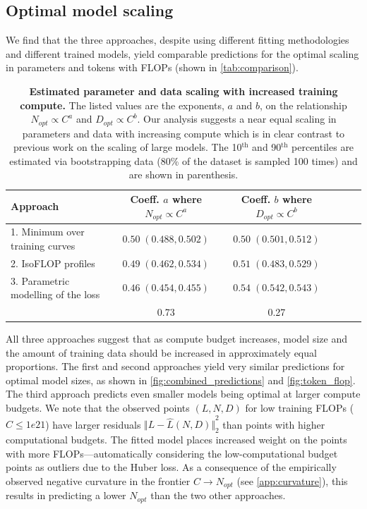 \documentclass[11pt, a4paper, logo, copyright, nonumbering]{deepmind}
\renewcommand{\leq}{\leqslant}
\begin{document}
\subsection{Optimal model scaling}
\label{sec:scaling-results}
We find that the three approaches, despite using different fitting methodologies and different trained models, yield comparable predictions for the optimal scaling in parameters and tokens with FLOPs (shown in \autoref{tab:comparison}).
\begin{table}[t]
    \caption{\textbf{Estimated parameter and data scaling with increased training compute.} 
    The listed values are the exponents, $a$ and $b$, on the relationship $N_{opt} \propto C^a$ and $D_{opt} \propto C^b$.
    Our analysis suggests a near equal scaling in parameters and data with increasing compute which is in clear contrast to previous work on the scaling of large models.
    The 10$^{\text{th}}$ and 90$^{\text{th}}$ percentiles are estimated via bootstrapping data (80\% of the dataset is sampled 100 times) and are shown in parenthesis.
    }
    \centering
    \begin{tabular}{lccccc}
    \toprule
    Approach & Coeff. $a$ where $N_{opt} \propto C^a$ & Coeff. $b$ where $D_{opt} \propto C^b$ \\
     \midrule
    1. Minimum over training curves & $0.50 \; ({0.488}, {0.502})$ & $0.50 \; (0.501, 0.512)$ \\ 
    2. IsoFLOP profiles & $0.49 \; (0.462, 0.534)$ &  $0.51 \; (0.483, 0.529)$ \\ 
    3. Parametric modelling of the loss & $0.46\; (0.454, 0.455)$ & $0.54  \; (0.542, 0.543)$ \\ 
    \midrule
    \citet{kaplan2020scaling} & 0.73 & 0.27 \\ 
    \bottomrule
    \end{tabular}
    \label{tab:comparison}
\end{table}
All three approaches suggest that as compute budget increases, model size and the amount of training data should be increased in approximately equal proportions.
The first and second approaches yield very similar predictions for optimal model sizes, as shown in \autoref{fig:combined_predictions} and \autoref{fig:token_flop}.
The third approach predicts even smaller models being optimal at larger compute budgets.
We note that the observed points $(L, N, D)$ for low training FLOPs ($C\leq1e21$) have larger residuals ${\Vert L - \hat L(N, D) \Vert}_2^2$ than points with higher computational budgets.
The fitted model places increased weight on the points with more FLOPs---automatically considering the low-computational budget points as outliers due to the Huber loss.
As a consequence of the empirically observed negative curvature in the frontier $C \to N_{opt}$ (see \autoref{app:curvature}), this results in predicting a lower $N_{opt}$ than the two other approaches.
\end{document}
